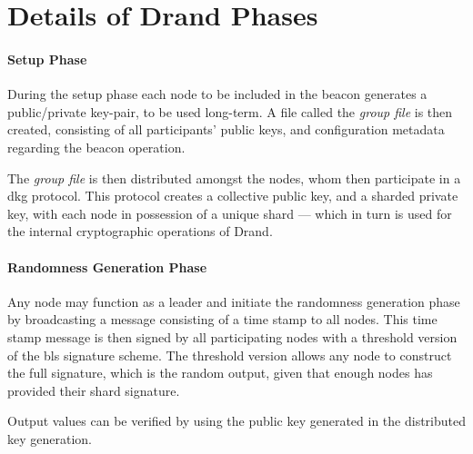 \section{Details of Drand Phases}%
\label{app:details_of_drand_phases}

\paragraph{Setup Phase}
During the setup phase each node to be included in the beacon generates a public/private key-pair, to be used long-term.
A file called the \textit{group file} is then created, consisting of all participants' public keys, and configuration metadata regarding the beacon operation.

The \textit{group file} is then distributed amongst the nodes, whom then participate in a \gls{dkg} protocol.
This protocol creates a collective public key, and a sharded private key, with each node in possession of a unique shard --- which in turn is used for the internal cryptographic operations of Drand.

\paragraph{Randomness Generation Phase}
Any node may function as a leader and initiate the randomness generation phase by broadcasting a message consisting of a time stamp to all nodes.
This time stamp message is then signed by all participating nodes with a threshold version of the \gls{bls} signature scheme.
The threshold version allows any node to construct the full signature, which is the random output, given that enough nodes has provided their shard signature.

Output values can be verified by using the public key generated in the distributed key generation.

